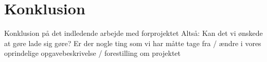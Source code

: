 \chapter{Konklusion}
Konklusion på det indledende arbejde med forprojektet
Altså:
Kan det vi ønskede at gøre lade sig gøre? Er der nogle ting som vi har måtte tage fra / ændre i vores oprindelige opgavebeskrivelse / forestilling om projektet